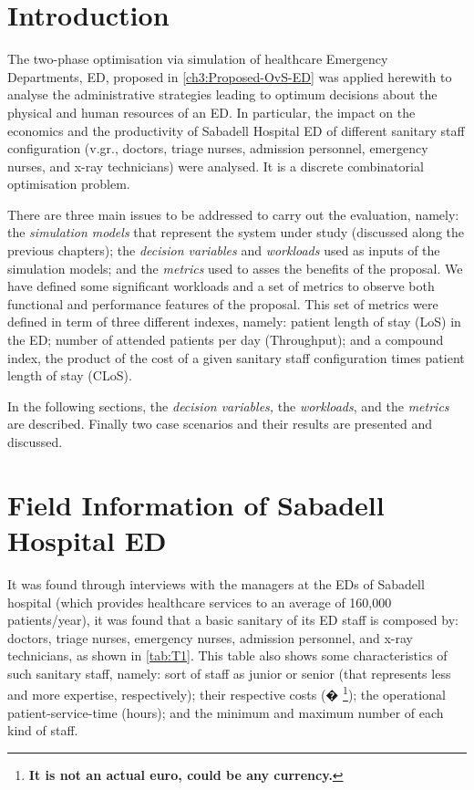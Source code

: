 

\section{Introduction}

The two-phase optimisation via simulation of healthcare Emergency
Departments, ED, proposed in \ref{ch3:Proposed-OvS-ED} was applied
herewith to analyse the administrative strategies leading to optimum
decisions about the physical and human resources of an ED. In particular,
the impact on the economics and the productivity of Sabadell Hospital
ED of different sanitary staff configuration (v.gr., doctors, triage
nurses, admission personnel, emergency nurses, and x-ray technicians)
were analysed. It is a discrete combinatorial optimisation problem.

There are three main issues to be addressed to carry out the evaluation,
namely: the \textit{simulation models} that represent the system under
study (discussed along the previous chapters); the \textit{decision
variables} and\textit{ workloads} used as inputs of the simulation
models; and the \textit{metrics} used to asses the benefits of the
proposal. We have defined some significant workloads and a set of
metrics to observe both functional and performance features of the
proposal. This set of metrics were defined in term of three different
indexes, namely: patient length of stay (LoS) in the ED; number of
attended patients per day (Throughput); and a compound index, the
product of the cost of a given sanitary staff configuration times
patient length of stay (CLoS).

In the following sections, the \textit{decision variables, }the\textit{
workloads}, and the \textit{metrics} are described. Finally two case
scenarios and their results are presented and discussed. 


\section{Field Information of Sabadell Hospital ED}

It was found through interviews with the managers at the EDs of Sabadell
hospital (which provides healthcare services to an average of 160,000
patients/year), it was found that a basic sanitary of its ED staff
is composed by: doctors, triage nurses, emergency nurses, admission
personnel, and x-ray technicians, as shown in \ref{tab:T1}. This
table also shows some characteristics of such sanitary staff, namely:
sort of staff as junior or senior (that represents less and more expertise,
respectively); their respective costs (� \textbf{}%
\footnote{\textbf{It is not an actual euro, could be any currency.\label{fn:euro}}%
}); the operational patient-service-time (hours); and the minimum and
maximum number of each kind of staff. 

